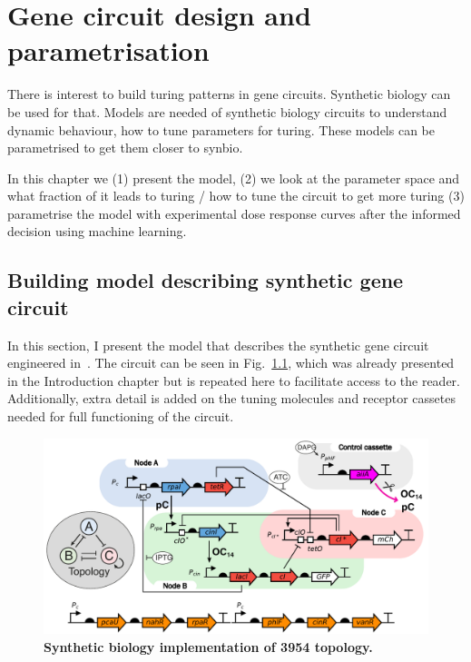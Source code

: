 
\chapter{Gene circuit design and parametrisation} \label{chapter2}
There is interest to build turing patterns in gene circuits. Synthetic biology can be used for that. Models are needed of synthetic biology circuits to understand dynamic behaviour, how to tune parameters for turing. These models can be parametrised to get them closer to synbio.

In this chapter we (1) present the model, (2) we look at the parameter space and what fraction of it leads to turing / how to tune the circuit to get more turing (3) parametrise the model with experimental dose response curves after the informed decision using machine learning.
\section{Building model describing synthetic gene circuit}
In this section, I present the model that describes the synthetic gene circuit engineered in~\cite{Tica2020}.
The circuit can be seen in Fig.~\ref{fig:synthetic circuit_chapter2}, which was already presented in the Introduction chapter but is repeated here to facilitate access to the reader.
Additionally, extra detail is added on the tuning molecules and receptor cassetes needed for full functioning of the circuit.

\begin{figure}[H]
    \centering
    \includegraphics[width=1\textwidth]{chapters/Chapter 2/synthetic circuit2}
    \caption[\textbf{Synthetic biology implementation of 3954) topology.}]{\textbf{Synthetic biology implementation of 3954 topology.} } %
    \label{fig:synthetic circuit_chapter2}
\end{figure}


